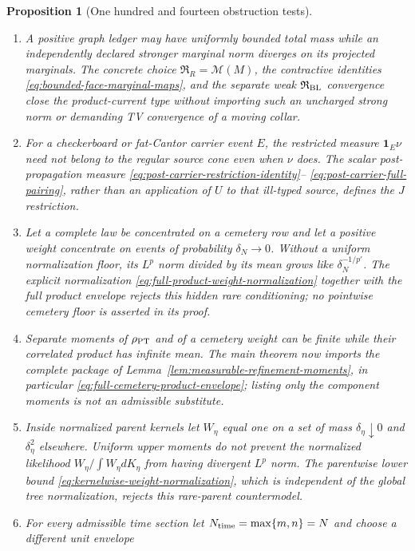 \documentclass[11pt]{article}
\newtheorem{proposition}[theorem]{Proposition}
\newcommand{\one}{\mathbf 1}
\begin{document}
\begin{proposition}[One hundred and fourteen obstruction tests]
\begin{enumerate}[label=\textup{(T\arabic*)}]
      estimate.
\item A positive graph ledger may have uniformly bounded total mass while an
      independently declared stronger marginal norm diverges on its projected
      marginals.  The concrete choice
      $\mathfrak R_R=\mathcal M(M)$, the contractive identities
      \eqref{eq:bounded-face-marginal-maps}, and the separate weak
      $\mathfrak R_{\rm BL}$ convergence close the product-current type
      without importing such an uncharged strong norm or demanding TV
      convergence of a moving collar.
\item For a checkerboard or fat-Cantor carrier event $E$, the restricted
      measure $\one_E\nu$ need not belong to the regular source cone even
      when $\nu$ does.  The scalar post-propagation measure
      \eqref{eq:post-carrier-restriction-identity}--
      \eqref{eq:post-carrier-full-pairing}, rather than an application of
      $U$ to that ill-typed source, defines the $J$ restriction.
\item Let a complete law be concentrated on a cemetery row and let a
      positive weight concentrate on events of probability $\delta_N\to0$.
      Without a uniform normalization floor, its $L^p$ norm divided by its
      mean grows like $\delta_N^{-1/p'}$.  The explicit normalization
      \eqref{eq:full-product-weight-normalization} together with the full
      product envelope rejects this hidden rare conditioning; no pointwise
      cemetery floor is asserted in its proof.
\item Separate moments of $\rho_{\rm PT}$ and of a cemetery weight can be
      finite while their correlated product has infinite mean.  The main
      theorem now imports the complete package of
      Lemma~\ref{lem:measurable-refinement-moments}, in particular
      \eqref{eq:full-cemetery-product-envelope}; listing only the component
      moments is not an admissible substitute.
\item Inside normalized parent kernels let $W_\eta$ equal one on a set of
      mass $\delta_\eta\downarrow0$ and $\delta_\eta^2$ elsewhere.  Uniform
      upper moments do not prevent the normalized likelihood
      $W_\eta/\int W_\eta dK_\eta$ from having divergent $L^p$ norm.  The
      parentwise lower bound
      \eqref{eq:kernelwise-weight-normalization}, which is independent of the
      global tree normalization, rejects this rare-parent countermodel.
\item For every admissible time section let
      $N_{\rm time}=\max\{m,n\}=N$ and choose a different unit envelope

\end{enumerate}
\end{proposition}
\end{document}
